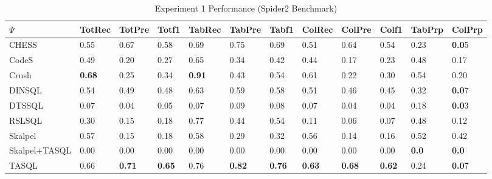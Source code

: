 \begin{table*}
\caption{Experiment 1 Performance (Spider2 Benchmark)}
\label{tab:exp1-spider2}
\begin{tabular}{llllllllllll}
\toprule
$\Psi$ & TotRec & TotPre & Totf1 & TabRec & TabPre & Tabf1 & ColRec & ColPre & Colf1 & TabPrp & ColPrp \\
\midrule
CHESS & 0.55 & 0.67 & 0.58 & 0.69 & 0.75 & 0.69 & 0.51 & 0.64 & 0.54 & 0.23 & \textbf{0.0}5 \\
CodeS & 0.49 & 0.20 & 0.27 & 0.65 & 0.34 & 0.42 & 0.44 & 0.17 & 0.23 & 0.48 & 0.17 \\
Crush & \textbf{0.68} & 0.25 & 0.34 & \textbf{0.91} & 0.43 & 0.54 & 0.61 & 0.22 & 0.30 & 0.54 & 0.20 \\
DINSQL & 0.54 & 0.49 & 0.48 & 0.63 & 0.59 & 0.58 & 0.51 & 0.46 & 0.45 & 0.32 & \textbf{0.0}7 \\
DTSSQL & 0.07 & 0.04 & 0.05 & 0.07 & 0.09 & 0.08 & 0.07 & 0.04 & 0.04 & 0.18 & \textbf{0.0}3 \\
RSLSQL & 0.30 & 0.15 & 0.18 & 0.77 & 0.44 & 0.54 & 0.11 & 0.06 & 0.07 & 0.48 & 0.12 \\
Skalpel & 0.57 & 0.15 & 0.18 & 0.58 & 0.29 & 0.32 & 0.56 & 0.14 & 0.16 & 0.52 & 0.42 \\
Skalpel+TASQL & 0.00 & 0.00 & 0.00 & 0.00 & 0.00 & 0.00 & 0.00 & 0.00 & 0.00 & \textbf{0.0} & \textbf{0.0} \\
TASQL & 0.66 & \textbf{0.71} & \textbf{0.65} & 0.76 & \textbf{0.82} & \textbf{0.76} & \textbf{0.63} & \textbf{0.68} & \textbf{0.62} & 0.24 & \textbf{0.0}7 \\
\bottomrule
\end{tabular}
\end{table*}
